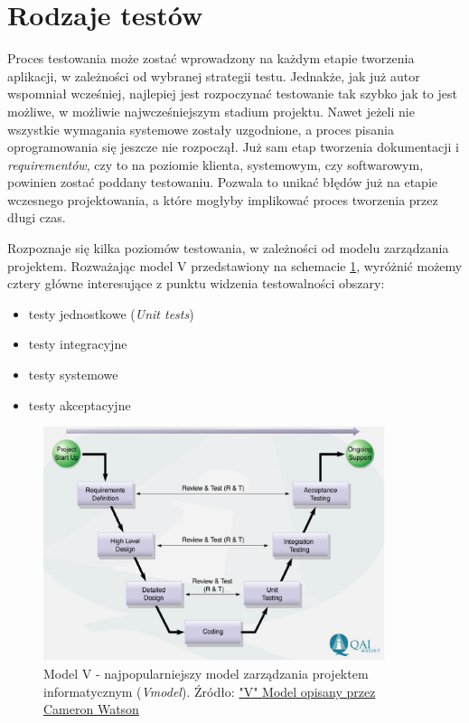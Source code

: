 \section{Rodzaje testów}
Proces testowania może zostać wprowadzony na każdym etapie tworzenia aplikacji, w zależności od wybranej strategii testu. Jednakże, jak już autor wspomniał wcześniej, najlepiej jest rozpoczynać testowanie tak szybko jak to jest możliwe, w możliwie najwcześniejszym stadium projektu. Nawet jeżeli nie wszystkie wymagania systemowe zostały uzgodnione, a proces pisania oprogramowania się jeszcze nie rozpoczął. Już sam etap tworzenia dokumentacji i \textit{requirementów}, czy to na poziomie klienta, systemowym, czy softwarowym, powinien zostać poddany testowaniu. Pozwala to unikać błędów już na etapie wczesnego projektowania, a które mogłyby implikować proces tworzenia przez długi czas.

Rozpoznaje się kilka poziomów testowania, w zależności od modelu zarządzania projektem. Rozważając model V przedstawiony na schemacie \ref{fig:model_v}, wyróżnić możemy cztery główne interesujące z punktu widzenia testowalności obszary:

\begin{itemize}
\item
testy jednostkowe (\textit{Unit tests})
\item
testy integracyjne
\item
testy systemowe
\item
testy akceptacyjne

\end{itemize}

\begin{figure}[!htb]
    \centering
    \includegraphics[width=10cm]{imgs/ch2_model_v.jpg}
    \caption{Model V - najpopularniejszy model zarządzania projektem informatycznym (\textit{V\-model}). Źródło: \href{http://www.projectinsight.net/blogs/it-project-management-solutions/the-quot-v-quot-model-by-cameron-watson}{"V" Model opisany przez Cameron Watson}}
    \label{fig:model_v}
\end{figure} 

